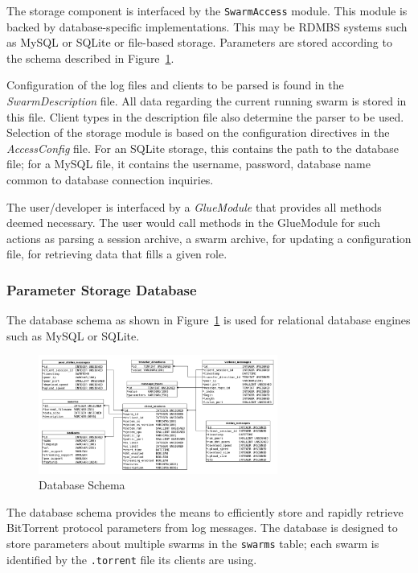 The storage component is interfaced by the \texttt{SwarmAccess} module. This
module is backed by database-specific implementations. This may be RDMBS
systems such as MySQL or SQLite or file-based storage. Parameters are stored
according to the schema described in
Figure~\ref{fig:proto-measure:database-schema}.

Configuration of the log files and clients to be parsed is found in the
\textit{SwarmDescription} file. All data regarding the current running swarm
is stored in this file. Client types in the description file also determine
the parser to be used. Selection of the storage module is based on the
configuration directives in the \textit{AccessConfig} file. For an SQLite
storage, this contains the path to the database file; for a MySQL file, it
contains the username, password, database name common to database connection
inquiries.

The user/developer is interfaced by a \textit{GlueModule} that provides all
methods deemed necessary. The user would call methods in the GlueModule for
such actions as parsing a session archive, a swarm archive, for updating a
configuration file, for retrieving data that fills a given role.

\subsubsection{Parameter Storage Database}

The database schema as shown in Figure~\ref{fig:proto-measure:database-schema}
is used for relational database engines such as MySQL or SQLite.

\begin{figure}[h]
  \begin{center}
    \includegraphics[width=0.7\textwidth]{src/img/proto-measure/database-schema}
  \end{center}
  \caption{Database Schema}
  \label{fig:proto-measure:database-schema}
\end{figure}

The database schema provides the means to efficiently store and rapidly
retrieve BitTorrent protocol parameters from log messages. The database is
designed to store parameters about multiple swarms in the \texttt{swarms}
table; each swarm is identified by the \texttt{.torrent} file its clients are
using.

